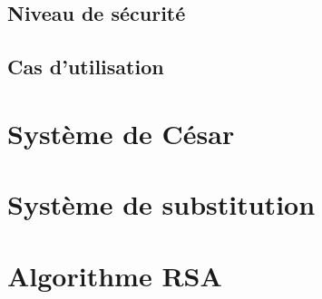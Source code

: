 		\subsection{Niveau de sécurité}
		\subsection{Cas d'utilisation}
	\section{Système de César}
	\section{Système de substitution}
	\section{Algorithme RSA}
